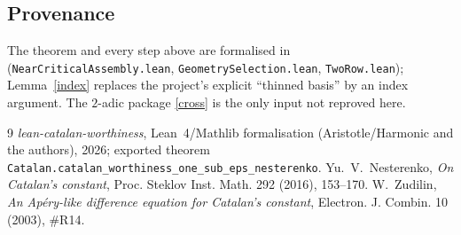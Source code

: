 \documentclass[11pt]{amsart}
\theoremstyle{remark}
\begin{document}
\subsection*{Provenance} The theorem and every step above are formalised in \cite{Lean} (\texttt{NearCriticalAssembly.lean}, \texttt{GeometrySelection.lean}, \texttt{TwoRow.lean}); Lemma~\ref{index} replaces the project's explicit ``thinned basis'' by an index argument. The $2$-adic package \eqref{cross} is the only input not reproved here.

\begin{thebibliography}{9}
 \emph{lean-catalan-worthiness}, Lean~4/Mathlib formalisation (Aristotle/Harmonic and the authors), 2026; exported theorem \texttt{Catalan.catalan\_worthiness\_one\_sub\_eps\_nesterenko}.
 Yu.~V.~Nesterenko, \emph{On Catalan's constant}, Proc. Steklov Inst. Math. 292 (2016), 153--170.
 W.~Zudilin, \emph{An Ap\'ery-like difference equation for Catalan's constant}, Electron. J. Combin. 10 (2003), \#R14.
\end{thebibliography}
\end{document}
